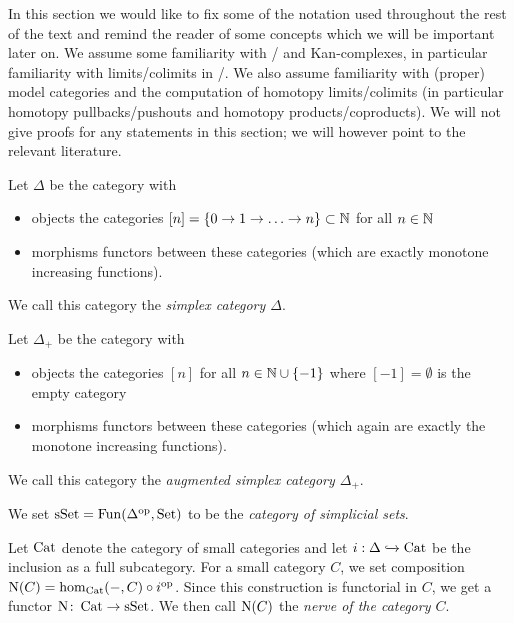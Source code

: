 In this section we would like to fix some of the notation used throughout the rest of the text and remind the reader of some concepts which we will be important later on.
We assume some familiarity with \inftycats/ and Kan-complexes, in particular familiarity with limits/colimits in \inftycats/.
We also assume familiarity with (proper) model categories and the computation of homotopy limits/colimits (in particular homotopy pullbacks/pushouts and homotopy products/coproducts).
We will not give proofs for any statements in this section; we will however point to the relevant literature.
\begin{definition}
    Let $\Delta$ be the category with
    \begin{itemize}
        \item objects the categories $[n]=\{0\to1\to\ldots\to n\}\subset\mathbb{N}$ for all $n\in\mathbb{N}$
        \item morphisms functors between these categories (which are exactly monotone increasing functions).
    \end{itemize}
    We call this category the \emph{simplex category $\Delta$}.
\end{definition}
\begin{definition}
    Let $\Delta_+$ be the category with
    \begin{itemize}
        \item objects the categories $[n]$ for all $n\in\mathbb{N}\cup\left\lbrace-1\right\rbrace$ where $[-1]=\emptyset$ is the empty category
        \item morphisms functors between these categories (which again are exactly the monotone increasing functions).
    \end{itemize}
    We call this category the \emph{augmented simplex category $\Delta_+$}.
\end{definition}
\begin{definition}
    We set $\operatorname{sSet}=\operatorname{Fun}(\Delta^{\operatorname{op}},\operatorname{Set})$ to be the \emph{category of simplicial sets}.
\end{definition}
\begin{definition}
    Let $\operatorname{Cat}$ denote the category of small categories and let $i:\Delta\xhookrightarrow{}\operatorname{Cat}$ be the inclusion as a full subcategory.
    For a small category $C$, we set composition $\operatorname{N}(C)=\hom_{\operatorname{Cat}}(-,C)\circ i^{\operatorname{op}}$.
    Since this construction is functorial in $C$, we get a functor $\operatorname{N}\colon\operatorname{Cat}\to\operatorname{sSet}$. 
    We then call $\operatorname{N}(C)$ the \emph{nerve of the category $C$}.
\end{definition}
